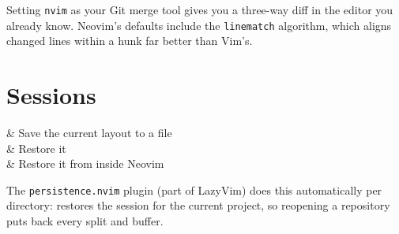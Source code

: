 \begin{remark}
	Setting \texttt{nvim} as your Git merge tool gives you a three-way diff in the
	editor you already know. Neovim's  defaults include the
	\texttt{linematch} algorithm, which aligns changed lines within a hunk far
	better than Vim's.
\end{remark}

\section{Sessions}\label{sec:vim-sessions}

\begin{keys}[0.30]
	  & Save the current layout to a file          \\
	      & Restore it                                 \\
	      & Restore it from inside Neovim              \\
\end{keys}

\begin{note}
	The \texttt{persistence.nvim} plugin (part of LazyVim) does this automatically
	per directory:    restores the session for the
	current project, so reopening a repository puts back every split and buffer.
\end{note}
